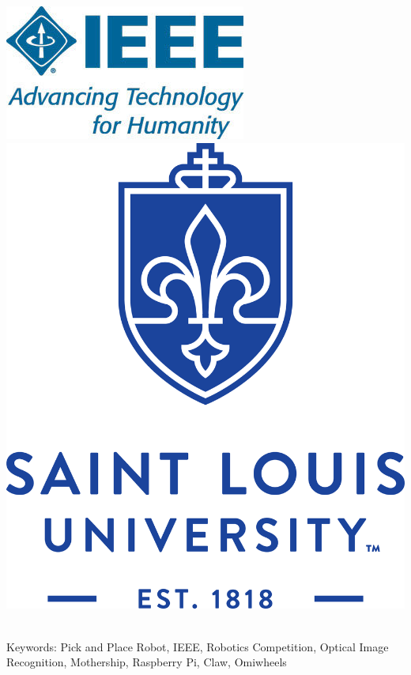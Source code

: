 \documentclass[12pt]{article}
\begin{document}
\begin{center}\includegraphics[scale=0.5]{ieee} \hspace{1cm} \includegraphics[scale=0.15]{slu}\\~\\\end{center}

\noindent Keywords: Pick and Place Robot, IEEE, Robotics Competition, Optical Image Recognition, Mothership, Raspberry Pi, Claw, Omiwheels
\thispagestyle{empty}
\pagebreak

\thispagestyle{empty}
\tableofcontents
\pagebreak

\cleardoublepage
\setcounter{page}{1}
\end{document}
